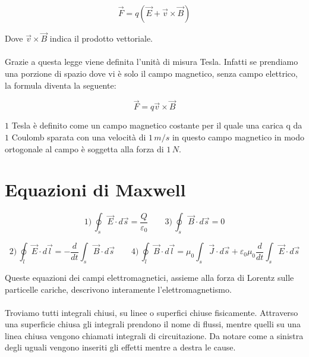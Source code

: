 \begin{equation}
    \vec{F} = q(\vec{E}+ \vec{v} \times \vec{B})
\end{equation}

Dove $\vec{v} \times \vec{B}$ indica il prodotto vettoriale.
\paragraph{}
Grazie a questa legge viene definita l'unità di misura Tesla. Infatti se prendiamo una porzione di spazio dove vi è solo il campo magnetico, senza campo elettrico, la formula diventa la seguente:

\begin{equation}
    \vec{F} = q \vec{v} \times \vec{B}
\end{equation}

$1$ Tesla è definito come un campo magnetico costante per il quale  una carica q da $1$ Coulomb sparata con una velocità di $1\,m/s$ in questo campo magnetico in modo ortogonale al campo è soggetta alla forza di $1\,N$.


\section{Equazioni di Maxwell}

\begin{equation*}
    1)\,\oint_s \vec{E} \cdot d\vec{s}  = \frac{Q}{\varepsilon_0}\qquad3)\,\oint_s \vec{B} \cdot d\vec{s}  = 0
\end{equation*}

\begin{equation*}
    2)\,\oint_l \vec{E} \cdot d\vec{l}  = -\frac{d}{dt}\int_s \vec{B}\cdot d\vec{s}\qquad4)\,\oint_l \vec{B} \cdot d\vec{l}  = \mu_0 \int_s \vec{J} \cdot d\vec{s} + \varepsilon_0\mu_0\frac{d}{dt}\int_s \vec{E} \cdot d\vec{s}
\end{equation*}

Queste equazioni dei campi elettromagnetici, assieme alla forza di Lorentz sulle particelle cariche, descrivono interamente l'elettromagnetismo.

\paragraph{}
Troviamo tutti integrali chiusi, su linee o superfici chiuse fisicamente. Attraverso una superficie chiusa gli integrali prendono il nome di flussi, mentre quelli su una linea chiusa vengono chiamati integrali di circuitazione.
Da notare come a sinistra degli uguali vengono inseriti gli effetti mentre a destra le cause.

